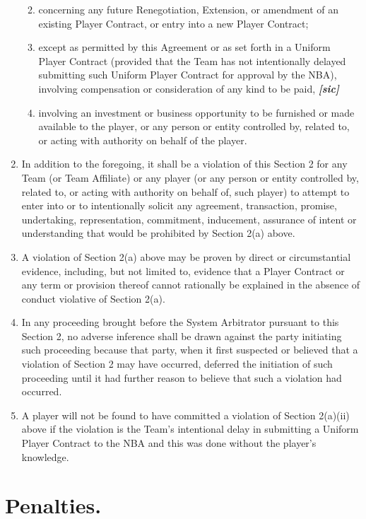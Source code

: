 \documentclass[
]{book}
\providecommand{\tightlist}{%
  \setlength{\itemsep}{0pt}\setlength{\parskip}{0pt}}
\begin{document}
\begin{enumerate}
  \begin{enumerate}
  \def\labelenumii{(\roman{enumii})}
  \tightlist
  \item
    concerning any future Renegotiation, Extension, or amendment of an existing Player Contract, or entry into a new Player Contract;
  \item
    except as permitted by this Agreement or as set forth in a Uniform Player Contract (provided that the Team has not intentionally delayed submitting such Uniform Player Contract for approval by the NBA), involving compensation or consideration of any kind to be paid, \textbf{\emph{{[}sic{]}}}
  \item
    involving an investment or business opportunity to be furnished or made available to the player, or any person or entity controlled by, related to, or acting with authority on behalf of the player.
  \end{enumerate}
\item
  In addition to the foregoing, it shall be a violation of this Section 2 for any Team (or Team Affiliate) or any player (or any person or entity controlled by, related to, or acting with authority on behalf of, such player) to attempt to enter into or to intentionally solicit any agreement, transaction, promise, undertaking, representation, commitment, inducement, assurance of intent or understanding that would be prohibited by Section 2(a) above.
\item
  A violation of Section 2(a) above may be proven by direct or circumstantial evidence, including, but not limited to, evidence that a Player Contract or any term or provision thereof cannot rationally be explained in the absence of conduct violative of Section 2(a).
\item
  In any proceeding brought before the System Arbitrator pursuant to this Section 2, no adverse inference shall be drawn against the party initiating such proceeding because that party, when it first suspected or believed that a violation of Section 2 may have occurred, deferred the initiation of such proceeding until it had further reason to believe that such a violation had occurred.
\item
  A player will not be found to have committed a violation of Section 2(a)(ii) above if the violation is the Team's intentional delay in submitting a Uniform Player Contract to the NBA and this was done without the player's knowledge.
\end{enumerate}

\hypertarget{penalties.}{%
\section{Penalties.}\label{penalties.}}
\end{document}
